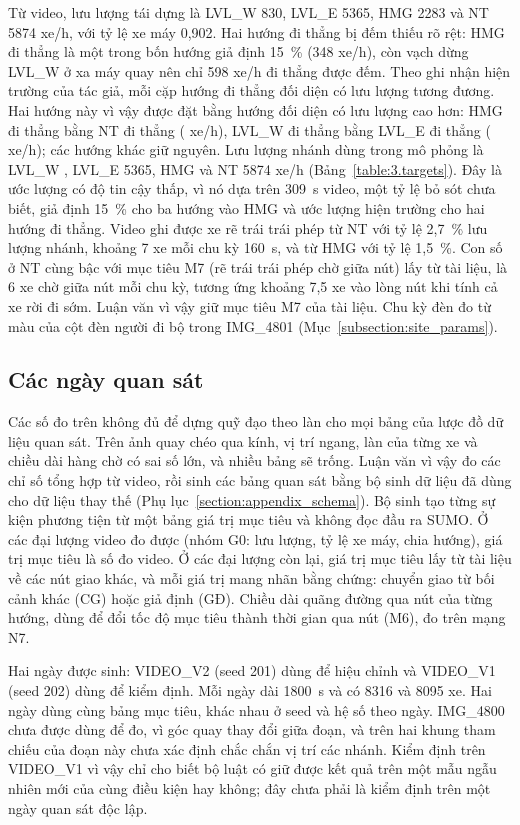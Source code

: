 \documentclass[../main.tex]{subfiles}
\begin{document}
Từ video, lưu lượng tái dựng là LVL\_W 830, LVL\_E 5365, HMG 2283 và NT 5874 xe/h, với tỷ lệ xe máy 0,902. Hai hướng đi thẳng bị đếm thiếu rõ rệt: HMG đi thẳng là một trong bốn hướng giả định 15~\% (348 xe/h), còn vạch dừng LVL\_W ở xa máy quay nên chỉ 598 xe/h đi thẳng được đếm. Theo ghi nhận hiện trường của tác giả, mỗi cặp hướng đi thẳng đối diện có lưu lượng tương đương. Hai hướng này vì vậy được đặt bằng hướng đối diện có lưu lượng cao hơn: HMG đi thẳng bằng NT đi thẳng ( xe/h), LVL\_W đi thẳng bằng LVL\_E đi thẳng ( xe/h); các hướng khác giữ nguyên. Lưu lượng nhánh dùng trong mô phỏng là LVL\_W , LVL\_E 5365, HMG  và NT 5874 xe/h (Bảng~\ref{table:3.targets}). Đây là ước lượng có độ tin cậy thấp, vì nó dựa trên 309~s video, một tỷ lệ bỏ sót chưa biết, giả định 15~\% cho ba hướng vào HMG và ước lượng hiện trường cho hai hướng đi thẳng. Video ghi được xe rẽ trái trái phép từ NT với tỷ lệ 2,7~\% lưu lượng nhánh, khoảng 7 xe mỗi chu kỳ 160~s, và từ HMG với tỷ lệ 1,5~\%. Con số ở NT cùng bậc với mục tiêu M7 (rẽ trái trái phép chờ giữa nút) lấy từ tài liệu, là 6 xe chờ giữa nút mỗi chu kỳ, tương ứng khoảng 7,5 xe vào lòng nút khi tính cả xe rời đi sớm. Luận văn vì vậy giữ mục tiêu M7 của tài liệu. Chu kỳ đèn đo từ màu của cột đèn người đi bộ trong IMG\_4801 (Mục~\ref{subsection:site_params}).

\subsection{Các ngày quan sát}

Các số đo trên không đủ để dựng quỹ đạo theo làn cho mọi bảng của lược đồ dữ liệu quan sát. Trên ảnh quay chéo qua kính, vị trí ngang, làn của từng xe và chiều dài hàng chờ có sai số lớn, và nhiều bảng sẽ trống. Luận văn vì vậy đo các chỉ số tổng hợp từ video, rồi sinh các bảng quan sát bằng bộ sinh dữ liệu đã dùng cho dữ liệu thay thế (Phụ lục~\ref{section:appendix_schema}). Bộ sinh tạo từng sự kiện phương tiện từ một bảng giá trị mục tiêu và không đọc đầu ra SUMO. Ở các đại lượng video đo được (nhóm G0: lưu lượng, tỷ lệ xe máy, chia hướng), giá trị mục tiêu là số đo video. Ở các đại lượng còn lại, giá trị mục tiêu lấy từ tài liệu về các nút giao khác, và mỗi giá trị mang nhãn bằng chứng: chuyển giao từ bối cảnh khác (CG) hoặc giả định (GĐ). Chiều dài quãng đường qua nút của từng hướng, dùng để đổi tốc độ mục tiêu thành thời gian qua nút (M6), đo trên mạng N7.

Hai ngày được sinh: VIDEO\_V2 (seed 201) dùng để hiệu chỉnh và VIDEO\_V1 (seed 202) dùng để kiểm định. Mỗi ngày dài 1800~s và có 8316 và 8095 xe. Hai ngày dùng cùng bảng mục tiêu, khác nhau ở seed và hệ số theo ngày. IMG\_4800 chưa được dùng để đo, vì góc quay thay đổi giữa đoạn, và trên hai khung tham chiếu của đoạn này chưa xác định chắc chắn vị trí các nhánh. Kiểm định trên VIDEO\_V1 vì vậy chỉ cho biết bộ luật có giữ được kết quả trên một mẫu ngẫu nhiên mới của cùng điều kiện hay không; đây chưa phải là kiểm định trên một ngày quan sát độc lập.
\end{document}
